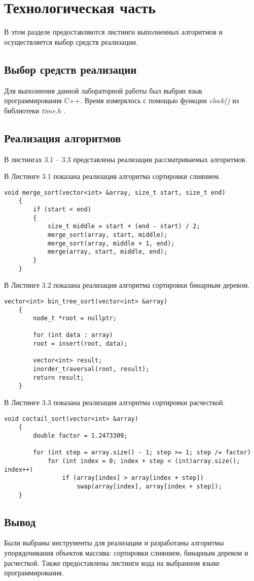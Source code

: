 \chapter{Технологическая часть}

В этом разделе предоставляются листинги выполненных алгоритмов и осуществляется выбор средств реализации.

\section{Выбор средств реализации}

Для выполнения данной лабораторной работы был выбран язык программирования C++. 
Время измерялось с помощью функции \textit{clock()} из библиотеки \textit{time.h} \cite{cpp-lang-time}.

\section{Реализация алгоритмов}

В листингах 3.1 -- 3.3 представлены реализации рассматриваемых алгоритмов.

\hspace{0.6cm}В Листинге 3.1 показана реализация алгоритма сортировки слиянием.

\bigskip
\begin{lstlisting}[caption=Алгоритм сортировки слиянием]
	void merge_sort(vector<int> &array, size_t start, size_t end)
	{
		if (start < end)
		{
			size_t middle = start + (end - start) / 2;
			merge_sort(array, start, middle);
			merge_sort(array, middle + 1, end);
			merge(array, start, middle, end);
		}
	}
\end{lstlisting}
\clearpage

\hspace{0.6cm}В Листинге 3.2 показана реализация алгоритма сортировки бинарным деревом.
\begin{lstlisting}[caption=Алгоритм сортировки бинарным деревом]
	vector<int> bin_tree_sort(vector<int> &array)
	{
		node_t *root = nullptr;
		
		for (int data : array)
		root = insert(root, data);
		
		vector<int> result; 
		inorder_traversal(root, result);
		return result;   
	} 
\end{lstlisting}

В Листинге 3.3 показана реализация алгоритма сортировки расчесткой.
\begin{lstlisting}[caption=Алгоритм сортировки расчесткой]
	void coctail_sort(vector<int> &array)
	{
		double factor = 1.2473309;
		
		for (int step = array.size() - 1; step >= 1; step /= factor)
		    for (int index = 0; index + step < (int)array.size(); index++)
		        if (array[index] > array[index + step])
		            swap(array[index], array[index + step]);
	}
\end{lstlisting}

\section*{Вывод}

Были выбраны инструменты для реализации и разработаны алгоритмы упорядочивания объектов массива: сортировки слиянием, бинарным деревом и расчесткой. 
Также предоставлены листинги кода на выбранном языке программирования.